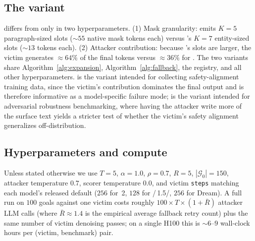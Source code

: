 \subsection{The \dual variant}
\label{sec:method:dual100}

\dual differs from \method only in two hyperparameters. (1) Mask granularity:
\dual emits $K{=}5$ paragraph-sized slots ($\sim 55$ native mask tokens each)
versus \method's $K{=}7$ entity-sized slots ($\sim 13$ tokens each). (2)
Attacker contribution: because \dual's slots are larger, the victim
generates $\approx 64\%$ of the final tokens versus $\approx 36\%$ for
\method. The two variants share Algorithm~\ref{alg:expansion},
Algorithm~\ref{alg:fallback}, the registry, and all other hyperparameters.
\dual is the variant intended for collecting safety-alignment training
data, since the victim's contribution dominates the final output and is
therefore informative as a model-specific failure mode; \method is the
variant intended for adversarial robustness benchmarking, where having the
attacker write more of the surface text yields a stricter test of whether
the victim's safety alignment generalizes off-distribution.

\subsection{Hyperparameters and compute}
\label{sec:method:hparams}

Unless stated otherwise we use $T=5$, $\alpha=1.0$, $\rho=0.7$, $R=5$,
$|\mathcal{G}_0|=150$, attacker temperature $0.7$, scorer temperature $0.0$,
and victim \texttt{steps} matching each model's released default
($256$ for \llada\,2, $128$ for \llada/\llada\,1.5/\mmada, $256$ for Dream).
A full run on $100$ goals against one victim costs roughly
$100\!\times\!T\!\times\!(1\!+\!\bar R)$ attacker LLM calls (where
$\bar R\!\approx\!1.4$ is the empirical average fallback retry count) plus
the same number of victim denoising passes; on a single H100 this is
$\sim 6$--$9$ wall-clock hours per (victim, benchmark) pair.
